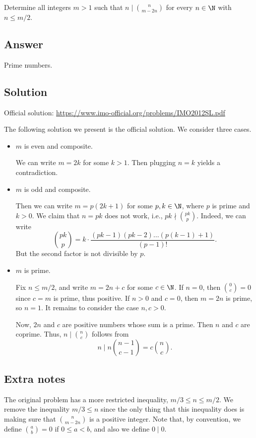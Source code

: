 Determine all integers $m > 1$ such that $n \mid \binom{n}{m - 2n}$ for every $n \in \N$ with $n \leq m/2$.



\subsection*{Answer}

Prime numbers.



\subsection*{Solution}

Official solution: \url{https://www.imo-official.org/problems/IMO2012SL.pdf}

The following solution we present is the official solution.
We consider three cases.

\begin{itemize}

\item
$m$ is even and composite.

We can write $m = 2k$ for some $k > 1$.
Then plugging $n = k$ yields a contradiction.

\item
$m$ is odd and composite.

Then we can write $m = p(2k + 1)$ for some $p, k \in \N$, where $p$ is prime and $k > 0$.
We claim that $n = pk$ does not work, i.e., $pk \nmid \binom{pk}{p}$.
Indeed, we can write
\[ \binom{pk}{p} = k \cdot \frac{(pk - 1)(pk - 2) \ldots (p(k - 1) + 1)}{(p - 1)!}. \]
But the second factor is not divisible by $p$.

\item
$m$ is prime.

Fix $n \leq m/2$, and write $m = 2n + c$ for some $c \in \N$.
If $n = 0$, then $\binom{0}{c} = 0$ since $c = m$ is prime, thus positive.
If $n > 0$ and $c = 0$, then $m = 2n$ is prime, so $n = 1$.
It remains to consider the case $n, c > 0$.

Now, $2n$ and $c$ are positive numbers whose sum is a prime.
Then $n$ and $c$ are coprime.
Thus, $n \mid \binom{n}{c}$ follows from
\[ n \mid n \binom{n - 1}{c - 1} = c \binom{n}{c}. \]

\end{itemize}



\subsection*{Extra notes}

The original problem has a more restricted inequality, $m/3 \leq n \leq m/2$.
We remove the inequality $m/3 \leq n$ since the only thing that this inequality does is making sure that $\binom{n}{m - 2n}$ is a positive integer.
Note that, by convention, we define $\binom{a}{b} = 0$ if $0 \leq a < b$, and also we define $0 \mid 0$.
